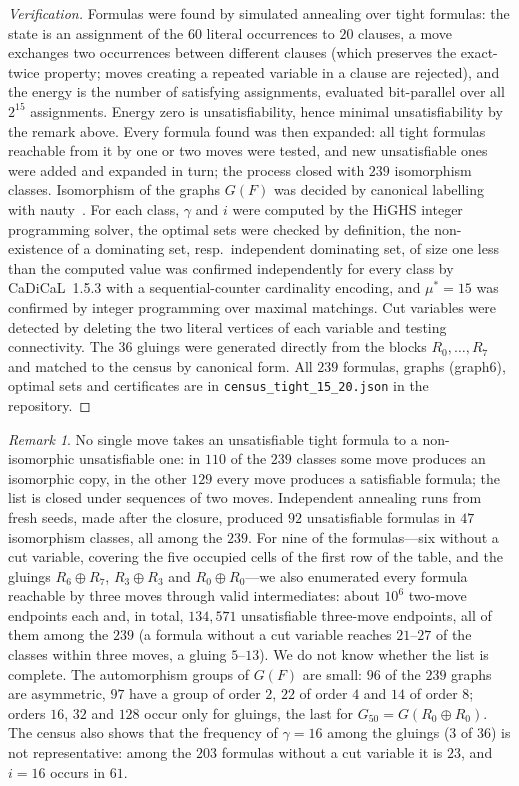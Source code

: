 \documentclass[11pt]{article}
\theoremstyle{remark}\newtheorem{remark}[theorem]{Remark}
\begin{document}
\begin{proof}[Verification]
Formulas were found by simulated annealing over tight formulas: the state is an assignment of the $60$ literal occurrences to $20$ clauses, a move exchanges two occurrences between different clauses (which preserves the exact-twice property; moves creating a repeated variable in a clause are rejected), and the energy is the number of satisfying assignments, evaluated bit-parallel over all $2^{15}$ assignments. Energy zero is unsatisfiability, hence minimal unsatisfiability by the remark above. Every formula found was then expanded: all tight formulas reachable from it by one or two moves were tested, and new unsatisfiable ones were added and expanded in turn; the process closed with $239$ isomorphism classes. Isomorphism of the graphs $G(F)$ was decided by canonical labelling with nauty~\cite{McKay}. For each class, $\gamma$ and $i$ were computed by the HiGHS integer programming solver, the optimal sets were checked by definition, the non-existence of a dominating set, resp.\ independent dominating set, of size one less than the computed value was confirmed independently for every class by CaDiCaL~1.5.3 with a sequential-counter cardinality encoding, and $\mu^*=15$ was confirmed by integer programming over maximal matchings. Cut variables were detected by deleting the two literal vertices of each variable and testing connectivity. The $36$ gluings were generated directly from the blocks $R_0,\dots,R_7$ and matched to the census by canonical form. All $239$ formulas, graphs (graph6), optimal sets and certificates are in \texttt{census\_tight\_15\_20.json} in the repository.
\end{proof}
\begin{remark}
No single move takes an unsatisfiable tight formula to a non-isomorphic unsatisfiable one: in $110$ of the $239$ classes some move produces an isomorphic copy, in the other $129$ every move produces a satisfiable formula; the list is closed under sequences of two moves. Independent annealing runs from fresh seeds, made after the closure, produced $92$ unsatisfiable formulas in $47$ isomorphism classes, all among the $239$. For nine of the formulas---six without a cut variable, covering the five occupied cells of the first row of the table, and the gluings $R_6\oplus R_7$, $R_3\oplus R_3$ and $R_0\oplus R_0$---we also enumerated every formula reachable by three moves through valid intermediates: about $10^6$ two-move endpoints each and, in total, $134{,}571$ unsatisfiable three-move endpoints, all of them among the $239$ (a formula without a cut variable reaches $21$--$27$ of the classes within three moves, a gluing $5$--$13$). We do not know whether the list is complete. The automorphism groups of $G(F)$ are small: $96$ of the $239$ graphs are asymmetric, $97$ have a group of order $2$, $22$ of order $4$ and $14$ of order $8$; orders $16$, $32$ and $128$ occur only for gluings, the last for $G_{50}=G(R_0\oplus R_0)$. The census also shows that the frequency of $\gamma=16$ among the gluings ($3$ of $36$) is not representative: among the $203$ formulas without a cut variable it is $23$, and $i=16$ occurs in $61$.
\end{remark}
\end{document}
